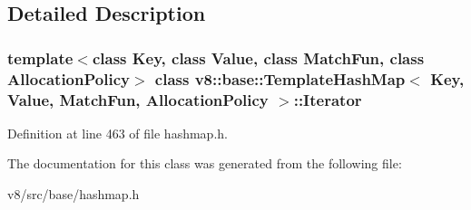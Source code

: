 \subsection{Detailed Description}
\subsubsection*{template$<$class Key, class Value, class Match\+Fun, class Allocation\+Policy$>$\newline
class v8\+::base\+::\+Template\+Hash\+Map$<$ Key, Value, Match\+Fun, Allocation\+Policy $>$\+::\+Iterator}



Definition at line 463 of file hashmap.\+h.



The documentation for this class was generated from the following file\+:\begin{DoxyCompactItemize}
\item 
v8/src/base/hashmap.\+h\end{DoxyCompactItemize}

